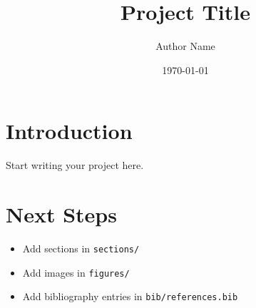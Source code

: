 \documentclass[12pt]{article}
\title{Project Title}
\author{Author Name}
\date{\today}
\begin{document}
\maketitle
\tableofcontents

\section{Introduction}
Start writing your project here.

\section{Next Steps}
\begin{itemize}
  \item Add sections in \texttt{sections/}
  \item Add images in \texttt{figures/}
  \item Add bibliography entries in \texttt{bib/references.bib}
\end{itemize}
\end{document}
